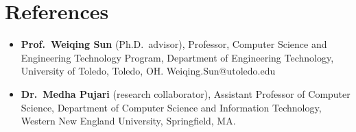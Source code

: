 \documentclass[11pt,a4paper]{article}
\begin{document}


\section{References}
\begin{itemize}
  \item \textbf{Prof.\ Weiqing Sun} (Ph.D.\ advisor), Professor, Computer Science and
        Engineering Technology Program, Department of Engineering Technology,
        University of Toledo, Toledo, OH. Weiqing.Sun@utoledo.edu
  \item \textbf{Dr.\ Medha Pujari} (research collaborator), Assistant Professor of
        Computer Science, Department of Computer Science and Information Technology,
        Western New England University, Springfield, MA.
\end{itemize}
\end{document}
